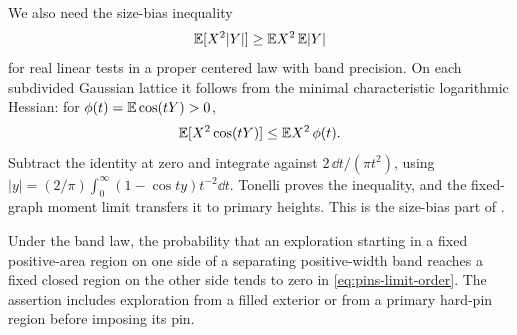 We also need the size-bias inequality
\begin{equation}
                   \mathbb E[X^2|Y|]\ge\mathbb E X^2\,\mathbb E|Y|
 \label{eq:pins-size-bias}
\end{equation}
for real linear tests in a proper centered law with band
precision. On each subdivided Gaussian lattice it follows
from the minimal characteristic logarithmic Hessian:
for \(\phi(t)=\mathbb E\cos(tY)>0\),
\[
 \mathbb E[X^2\cos(tY)]\le\mathbb E X^2\,\phi(t).
\]
Subtract the identity at zero and integrate against
\(2\,\dd t/(\pi t^2)\), using
\(|y|=(2/\pi)\int_0^\infty(1-\cos ty)t^{-2}\dd t\).
Tonelli proves the inequality, and the fixed-graph moment
limit transfers it to primary heights. This is the
size-bias part of .



\begin{proposition}\label{prop:pins-reach}
Under the band law, the probability that an exploration
starting in a fixed positive-area region on one side of a separating
positive-width band reaches a fixed closed region on the
other side tends to zero in \eqref{eq:pins-limit-order}.
The assertion includes exploration from a filled exterior
or from a primary hard-pin region before imposing its pin.
\end{proposition}

